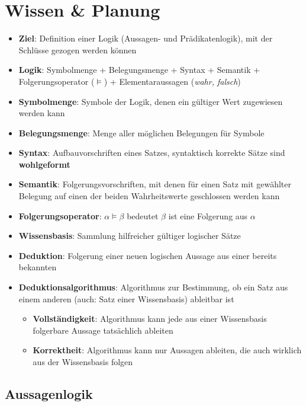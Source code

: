 \section{Wissen \& Planung}%
\label{sec:wissen_planung}

\begin{itemize}
	\item \textbf{Ziel}: Definition einer Logik (Aussagen- und Prädikatenlogik), mit der Schlüsse gezogen werden können
	\item \textbf{Logik}: Symbolmenge + Belegungsmenge + Syntax + Semantik + Folgerungsoperator ($\models$) + Elementaraussagen (\textit{wahr, falsch})
	\item \textbf{Symbolmenge}: Symbole der Logik, denen ein gültiger Wert zugewiesen werden kann
	\item \textbf{Belegungsmenge}: Menge aller möglichen Belegungen für Symbole
	\item \textbf{Syntax}: Aufbauvorschriften eines Satzes, syntaktisch korrekte Sätze sind \textbf{wohlgeformt}
	\item \textbf{Semantik}: Folgerungsvorschriften, mit denen für einen Satz mit gewählter Belegung auf einen der beiden Wahrheitswerte geschlossen werden kann
	\item \textbf{Folgerungsoperator}: $\alpha \models \beta$ bedeutet $\beta$ ist eine Folgerung aus $\alpha$
	\item \textbf{Wissensbasis}: Sammlung hilfreicher gültiger logischer Sätze
	\item \textbf{Deduktion}: Folgerung einer neuen logischen Aussage aus einer bereits bekannten
	\item \textbf{Deduktionsalgorithmus}: Algorithmus zur Bestimmung, ob ein Satz aus einem anderen (auch: Satz einer Wissensbasis) ableitbar ist
	\begin{itemize}
		\item \textbf{Vollständigkeit}: Algorithmus kann jede aus einer Wissensbasis folgerbare Aussage tatsächlich ableiten
		\item \textbf{Korrektheit}: Algorithmus kann nur Aussagen ableiten, die auch wirklich aus der Wissensbasis folgen
	\end{itemize}
\end{itemize}

\subsection{Aussagenlogik}%
\label{wrep:sub:aussagenlogik}

